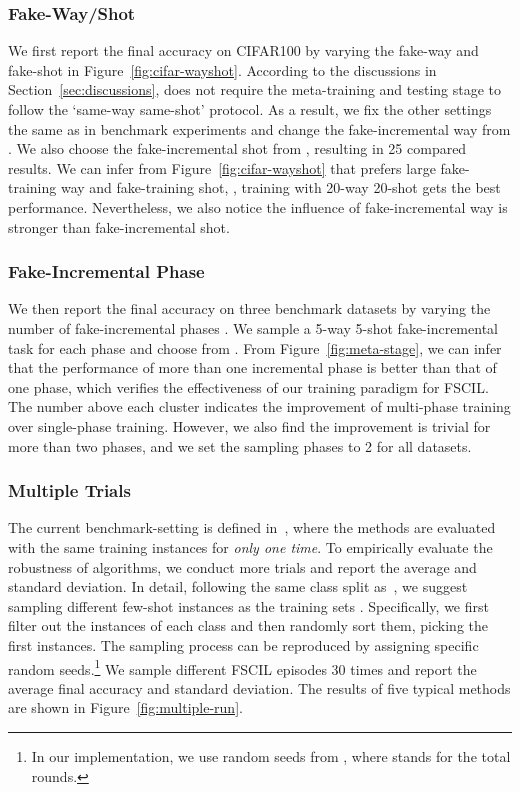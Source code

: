 \subsubsection{Fake-Way/Shot}
We first report the final accuracy on CIFAR100 by varying the fake-way and fake-shot in Figure~\ref{fig:cifar-wayshot}.
According to the discussions in Section~\ref{sec:discussions}, \name does not require the meta-training and testing stage to follow the `same-way same-shot' protocol. As a result, we fix the other settings the same as in benchmark experiments and change the fake-incremental way from . We also choose the fake-incremental shot from , resulting in 25 compared results. We can infer from Figure~\ref{fig:cifar-wayshot} that \name prefers large fake-training way and fake-training shot, \ie, training with 20-way 20-shot gets the best performance. Nevertheless, we also notice the influence of fake-incremental way is stronger than fake-incremental shot.

\subsubsection{Fake-Incremental Phase}
We then report the final accuracy on three benchmark datasets by varying the number of fake-incremental phases . 
We sample a 5-way 5-shot fake-incremental task for each phase and choose  from . 
From Figure~\ref{fig:meta-stage}, we can infer that the performance of more than one incremental phase is better than that of one phase, which verifies the effectiveness of our training paradigm for FSCIL.
The number above each cluster indicates the improvement of multi-phase training over single-phase training.
However, we also find the improvement is trivial for more than two phases, and we set the sampling phases to 2 for all datasets.



\subsubsection{Multiple Trials}
The current benchmark-setting is defined in~\cite{tao2020few}, where the methods are evaluated with the same training instances for \emph{only one time}. To empirically evaluate the robustness of algorithms, we conduct more trials and report the average and standard deviation.
In detail, following the same class split as~\cite{tao2020few}, we suggest sampling different few-shot instances as the training sets . Specifically, we first filter out the instances of each class and then randomly sort them, picking the first  instances. The sampling process can be reproduced by assigning specific random seeds.\footnote{In our implementation, we use random seeds from , where  stands for the total rounds.} 
We sample different FSCIL episodes 30 times and report the average final accuracy and standard deviation. The results of five typical methods are shown in Figure~\ref{fig:multiple-run}.

